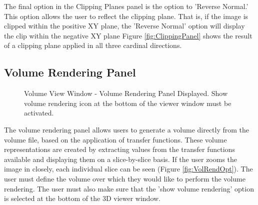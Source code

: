\documentclass[fleqn,11pt,openany]{book}
\begin{document}
The final option in the Clipping Planes panel is the option to 'Reverse Normal.'
This option allows the user to reflect the clipping plane.
That is, if the image is clipped within the positive XY plane, the 'Reverse Normal' option will display the clip within the negative XY plane
Figure \ref{fig:ClippingPanel} shows the result of a clipping plane applied in all three cardinal directions.

\subsection{Volume Rendering Panel}
\label{sec:volumerendering}
\begin{figure}[b!]
\caption{Volume View Window - Volume Rendering Panel Displayed. Show volume rendering icon at the bottom of the viewer window must be activated.}\label{fig:VolRendPanel}
\end{figure}

The volume rendering panel allows users to generate a volume directly from the volume file, based on the application of transfer functions.
These volume representations are created by extracting values from the transfer functions available and displaying them on a slice-by-slice basis.
If the user zooms the image in closely, each individual slice can be seen (Figure \ref{fig:VolRendOpt}).
The user must define the volume over which they would like to perform the volume rendering.
The user must also make sure that the 'show volume rendering' option is selected at the bottom of the 3D viewer window.
\end{document}
